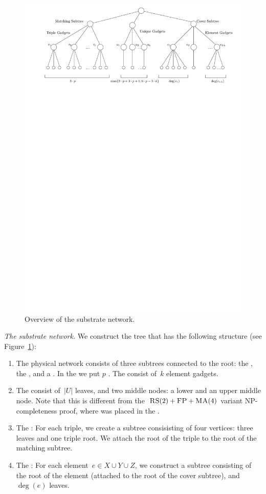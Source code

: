 \begin{figure}[t]
  \centering
  \includegraphics[width=0.9\columnwidth]{figs/static-mapping/overview2}
  \caption{Overview of the substrate network.}
  \label{fig:overview2}
\end{figure}


\emph{The substrate network.}
We construct the tree that has the following structure (see Figure~\ref{fig:overview2}):

\begin{enumerate}
  \item The physical network consists of three subtrees connected to
  the root: the {\MatchSubtree}, the {\CoverSubtree}, and a
  {\UnqSubtree}. In the {\MatchSubtree} we put $p$
  {\TripleGadgets}. The {\CoverSubtree} consist of~$k$ element gadgets.
  \item The {\UnqSubtree} consist of~$|U|$ leaves, and two middle nodes:
  a lower and an upper middle node. Note that this is different from the~$\textsc{RS}(2)+\textsc{FP}+\textsc{MA}(4)$ variant NP-completeness proof, where {\UnqSubtree} was placed in the {\MatchSubtree}.
  \item The \TripleGadget: For each triple, we create a subtree
  consisisting of four vertices: three leaves and one triple root.  We
  attach the root of the triple to the root of the matching subtree.
  \item The \ElGadget: For each element~$e \in X\cup Y\cup Z$, we
  construct a subtree consisting of the root of the element (attached
  to the root of the cover subtree), and~$\deg(e)$ leaves.
\end{enumerate}

